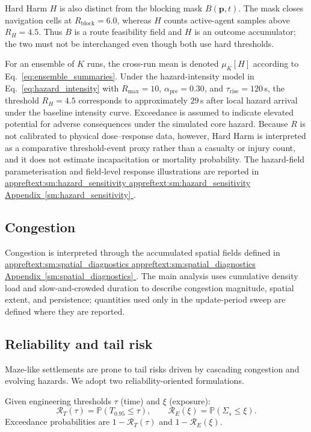 \documentclass[preprint,12pt]{elsarticle}
\providecommand{\FloatBarrier}{}
\let\origsubsection\subsection
\renewcommand{\subsection}{\FloatBarrier\origsubsection}
\DeclareRobustCommand{\appref}[1]{%
  \hyperref[#1]{%
    \ifcsname appreftext:#1\endcsname%
      \csname appreftext:#1\endcsname%
    \else%
      Appendix~\ref*{#1}%
    \fi%
  }%
}
\begin{document}
Hard Harm $H$ is also distinct from the blocking mask $B(\mathbf{p},t)$.
The mask closes navigation cells at $R_{\mathrm{block}}=6.0$, whereas
$H$ counts active-agent samples above $R_H=4.5$. Thus $B$ is a route
feasibility field and $H$ is an outcome accumulator; the two must not be
interchanged even though both use hard thresholds.

For an ensemble of $K$ runs, the cross-run mean is denoted $\mu_K[H]$
according to Eq.~\eqref{eq:ensemble_summaries}.
Under the hazard-intensity model in
Eq.~\eqref{eq:hazard_intensity} with $R_{\max}=10$,
$\alpha_{\mathrm{pre}}=0.30$, and $\tau_{\mathrm{rise}}=120$\,s, the
threshold $R_H=4.5$ corresponds to approximately $29$\,s after local
hazard arrival under the baseline intensity curve.
Exceedance is assumed to indicate elevated potential for adverse
consequences under the simulated core hazard. Because $R$ is not calibrated
to physical dose--response data, however, Hard Harm is interpreted as a
comparative threshold-event proxy rather than a casualty or injury count,
and it does not estimate incapacitation or mortality probability.
The hazard-field parameterisation and field-level response illustrations
are reported in
\appref{sm:hazard_sensitivity}.

\subsection{Congestion}
\label{sec:eval_congestion}

Congestion is interpreted through the accumulated spatial fields defined
in \appref{sm:spatial_diagnostics}. The main analysis uses cumulative
density load and slow-and-crowded duration to describe congestion magnitude,
spatial extent, and persistence; quantities used only in the update-period
sweep are defined where they are reported.

\subsection{Reliability and tail risk}
\label{sec:eval_reliability}

Maze-like settlements are prone to tail risks driven by cascading
congestion and evolving hazards. We adopt two reliability-oriented
formulations.

Given engineering thresholds $\tau$ (time) and $\xi$ (exposure):
\begin{equation}
\mathcal{R}_T(\tau) = \mathbb{P}(T_{0.95} \le \tau),
\qquad
\mathcal{R}_E(\xi) = \mathbb{P}(\Sigma_s \le \xi).
\label{eq:reliability}
\end{equation}
Exceedance probabilities are $1 - \mathcal{R}_T(\tau)$ and
$1 - \mathcal{R}_E(\xi)$.
\end{document}
